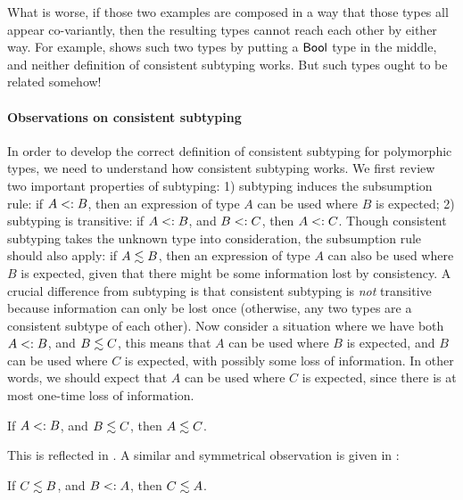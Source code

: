 What is worse, if those two examples are composed in a way that those types all
appear co-variantly, then the resulting types cannot reach each other by either
way. For example,  shows such two types by putting a
$\mathsf{Bool}$ type in the middle, and neither definition of consistent subtyping
works. But such types ought to be related somehow!

\paragraph{Observations on consistent subtyping}

In order to develop the correct definition of consistent subtyping for
polymorphic types, we need to understand how consistent subtyping works.
We first review two important properties of subtyping: 1) subtyping induces the
subsumption rule: if $A <: B$, then an expression of type $A$ can be used
where $B$ is expected; 2) subtyping is transitive: if $A <: B$, and $B <:
C$, then $A <: C$. Though consistent subtyping takes the unknown type into
consideration, the subsumption rule should also apply: if $A \lesssim B$, then
an expression of type $A$ can also be used where $B$ is expected, given that
there might be some information lost by consistency. A crucial difference from
subtyping is that consistent subtyping is \textit{not} transitive because
information can only be lost once (otherwise, any two types are a consistent
subtype of each other). Now consider a situation where we have both $A <: B$,
and $B \lesssim C$, this means that $A$ can be used where $B$ is expected, and
$B$ can be used where $C$ is expected, with possibly some loss of information. In
other words, we should expect that $A$ can be used where $C$ is expected, since
there is at most one-time loss of information.

\begin{observation}
  If $A <: B$, and $B \lesssim C$, then $A \lesssim C$.
\end{observation}

This is reflected in . A similar and symmetrical
observation is given in :

\begin{observation}
  If $C \lesssim B$, and $B <: A$, then $C \lesssim A$.
\end{observation}

